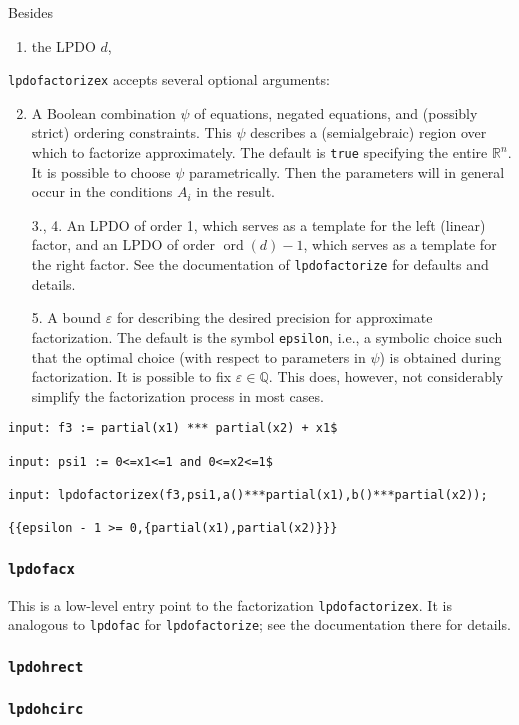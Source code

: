 \documentclass[a4paper]{article}
\newcommand{\Q}{\mathbb{Q}}
\newcommand{\R}{\mathbb{R}}
\begin{document}
Besides
\begin{enumerate}
\item the LPDO $d$,
\end{enumerate}
\texttt{lpdofactorizex} accepts several optional arguments:
\begin{enumerate}
\setcounter{enumi}{1}
\item A Boolean combination $\psi$ of equations, negated equations, and
  (possibly strict) ordering constraints. This $\psi$ describes a
  (semialgebraic) region over which to factorize approximately. The
  default is \texttt{true} specifying the entire $\R^n$. It is possible
  to choose $\psi$ parametrically. Then the parameters will in general
  occur in the conditions $A_i$ in the result.
\item[3., 4.] An LPDO of order 1, which serves as a template for the left
  (linear) factor, and an LPDO of order $\operatorname{ord}(d)-1$, which
  serves as a template for the right factor. See the documentation of
  \texttt{lpdofactorize} for defaults and details.
\item[5.] A bound $\varepsilon$ for describing the desired precision for
  approximate factorization. The default is the symbol \texttt{epsilon},
  i.e., a symbolic choice such that the optimal choice (with respect to
  parameters in $\psi$) is obtained during factorization. It is possible
  to fix $\varepsilon\in\Q$. This does, however, not considerably
  simplify the factorization process in most cases.
\end{enumerate}

\begin{footnotesize}
\begin{verbatim}
input: f3 := partial(x1) *** partial(x2) + x1$

input: psi1 := 0<=x1<=1 and 0<=x2<=1$

input: lpdofactorizex(f3,psi1,a()***partial(x1),b()***partial(x2));

{{epsilon - 1 >= 0,{partial(x1),partial(x2)}}}
\end{verbatim}
\end{footnotesize}

\subsubsection{\texttt{lpdofacx}}
This is a low-level entry point to the factorization
\texttt{lpdofactorizex}. It is analogous to \texttt{lpdofac} for
\texttt{lpdofactorize}; see the documentation there for details.

\subsubsection{\texttt{lpdohrect}}

\subsubsection{\texttt{lpdohcirc}}
\end{document}
